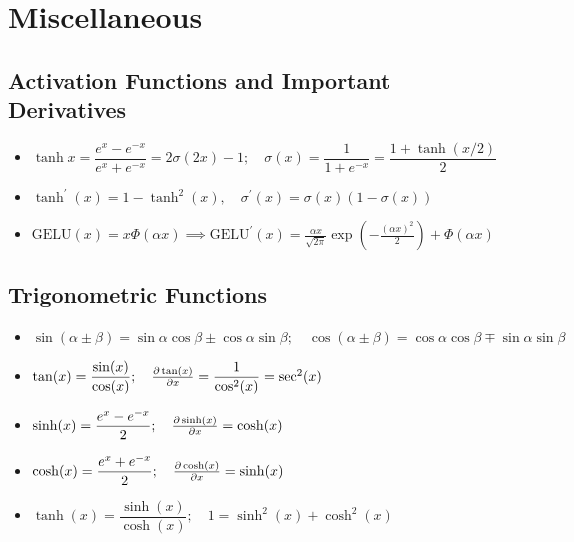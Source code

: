 \section{Miscellaneous}
\subsection{Activation Functions and Important Derivatives}
\begin{itemize}
    \item $\tanh{x}=\dfrac{e^x - e^{-x}}{e^x + e^{-x}} = 2\sigma (2x) - 1;\quad \sigma(x)=\dfrac{1}{1+e^{-x}} = \dfrac{1+\tanh(x/2)}{2}$
    \item $\tanh^\prime(x)=1-\tanh^2(x), \quad \sigma^\prime(x)=\sigma(x)(1-\sigma(x))$
    \item $\text{GELU}(x)=x\Phi(\alpha x) \implies \text{GELU}^\prime(x)= \frac{\alpha x}{\sqrt{2\pi}}\exp{(-\frac{(\alpha x)^2}{2})}+\Phi(\alpha x)$
\end{itemize}

\subsection{Trigonometric Functions}
\begin{itemize}
    \item $\sin(\alpha \pm \beta) = \sin \alpha \cos \beta \pm \cos \alpha \sin \beta; \quad \cos(\alpha \pm \beta) = \cos \alpha \cos \beta \mp \sin \alpha \sin \beta$
    \item $\tan(x) = \dfrac{\sin(x)}{\cos(x)}; \quad \frac{\partial \tan(x)}{\partial x}=\dfrac{1}{\cos^2(x)}=\sec^2(x)$
    \item $ \sinh(x) = \dfrac{e^x - e^{-x}}{2}; \quad \frac{\partial \sinh(x)}{\partial x}=\cosh(x)$
    \item $\cosh(x) = \dfrac{e^x + e^{-x}}{2}; \quad \frac{\partial \cosh(x)}{\partial x}=\sinh(x)$
    \item $\tanh(x) = \dfrac{\sinh(x)}{\cosh(x)}; \quad 1 = \sinh^2(x) + \cosh^2(x)$
\end{itemize}

    
